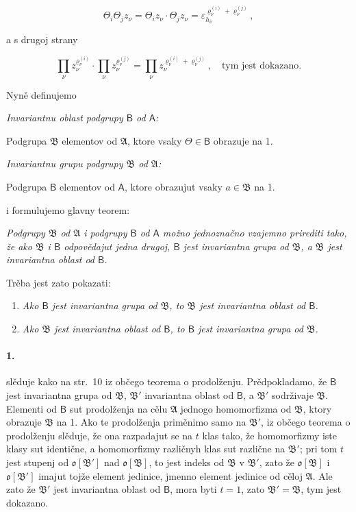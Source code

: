 \documentclass[11pt]{article}
\begin{document}
\[
\Theta_i\Theta_j z_\nu=\Theta_i z_\nu\cdot \Theta_j z_\nu
=\varepsilon_{h_\nu}^{\varrho_\nu^{(i)}+\varrho_\nu^{(j)}},
\]

a s drugoj strany

\[
\prod_\nu z_\nu^{\varrho_\nu^{(i)}}\cdot
\prod_\nu z_\nu^{\varrho_\nu^{(j)}}=
\prod_\nu z_\nu^{\varrho_\nu^{(i)}+\varrho_\nu^{(j)}},
\quad\text{tym jest dokazano.}
\]

Nyně definujemo

\emph{Invariantnu oblast podgrupy \(\mathsf B\) od \(\mathsf A\):}

Podgrupa \(\mathfrak B\) elementov od \(\mathfrak A\), ktore vsaky \(\Theta\in\mathsf B\) obrazuje na 1.

\emph{Invariantnu grupu podgrupy \(\mathfrak B\) od \(\mathfrak A\):}

Podgrupa \(\mathsf B\) elementov od \(\mathsf A\), ktore obrazujut vsaky \(a\in\mathfrak B\) na 1.

i formulujemo glavny teorem:

\emph{Podgrupy \(\mathfrak B\) od \(\mathfrak A\) i podgrupy \(\mathsf B\) od \(\mathsf A\) možno jednoznačno vzajemno prirediti tako, že ako \(\mathfrak B\) i \(\mathsf B\) odpovědajut jedna drugoj, \(\mathsf B\) jest invariantna grupa od \(\mathfrak B\), a \(\mathfrak B\) jest invariantna oblast od \(\mathsf B\).}

Trěba jest zato pokazati:

\begin{enumerate}
\item \emph{Ako \(\mathsf B\) jest invariantna grupa od \(\mathfrak B\), to \(\mathfrak B\) jest invariantna oblast od \(\mathsf B\).}
\item \emph{Ako \(\mathfrak B\) jest invariantna oblast od \(\mathsf B\), to \(\mathsf B\) jest invariantna grupa od \(\mathfrak B\).}
\end{enumerate}

\paragraph{1.}
slěduje kako na str.~10 iz občego teorema o prodolženju. Prědpokladamo, že \(\mathsf B\) jest invariantna grupa od \(\mathfrak B\), \(\mathfrak B'\) invariantna oblast od \(\mathsf B\), a \(\mathfrak B'\) sodrživaje \(\mathfrak B\). Elementi od \(\mathsf B\) sut prodolženja na cělu \(\mathfrak A\) jednogo homomorfizma od \(\mathfrak B\), ktory obrazuje \(\mathfrak B\) na 1. Ako te prodolženja priměnimo samo na \(\mathfrak B'\), iz občego teorema o prodolženju slěduje, že ona razpadajut se na \(t\) klas tako, že homomorfizmy iste klasy sut identične, a homomorfizmy različnyh klas sut različne na \(\mathfrak B'\); pri tom \(t\) jest stupenj od \(\mathfrak o[\mathfrak B']\) nad \(\mathfrak o[\mathfrak B]\), to jest indeks od \(\mathfrak B\) v \(\mathfrak B'\), zato že \(\mathfrak o[\mathfrak B]\) i \(\mathfrak o[\mathfrak B']\) imajut tojže element jedinice, jmenno element jedinice od cěloj \(\mathfrak A\). Ale zato že \(\mathfrak B'\) jest invariantna oblast od \(\mathsf B\), mora byti \(t=1\), zato \(\mathfrak B'=\mathfrak B\), tym jest dokazano.
\end{document}
